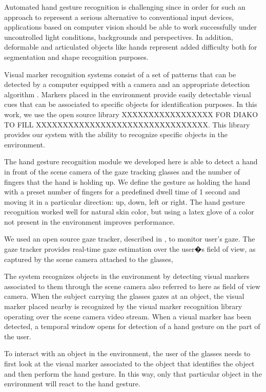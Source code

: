 \documentclass[jou,a4paper,notxfonts]{apa}
\begin{document}
Automated hand gesture recognition is challenging since in order for such an approach to represent a serious alternative
to conventional input devices, applications based on computer vision should be able to work successfully under
uncontrolled light conditions, backgrounds and perspectives. In addition, deformable and articulated objects like hands
represent added difficulty both for segmentation and shape recognition purposes.

Visual marker recognition systems consist of a set of patterns that can be detected by a computer equipped with a camera
and an appropriate detection algorithm \cite{middel19detection}. Markers placed in the environment provide easily
detectable visual cues that can be associated to specific objects for identification purposes. In this work, we use the
open source library XXXXXXXXXXXXXXXXX FOR DIAKO TO FILL XXXXXXXXXXXXXXXXXXXXXXXXXXXXXXXX. This library provides our
system with the ability to recognize specific objects in the environment.


The hand gesture recognition module we developed here is able to detect a hand in front of the scene camera of the gaze
tracking glasses and the number of fingers that the hand is holding up. We define the gesture
as holding the hand with a preset number of fingers for a predefined dwell time of 1 second and moving it in a particular direction:
up, down, left  or right. The hand gesture recognition worked well for natural skin color, but using a latex glove of a
color not present in the environment improves performance.


We used an open source gaze tracker, described in \cite{Mardanbegi2011}, to monitor user's gaze. The gaze tracker
provides real-time gaze estimation over the user�s field of view, as captured by the scene camera attached to the glasses,
 

The system recognizes objects in the environment by detecting visual markers associated to them through the scene camera
also referred to here as field of view camera. When the subject carrying the glasses gazes at an object, the visual
marker placed nearby is recognized by the visual marker recognition library operating over the scene camera video stream.
When a visual marker has been detected, a temporal window opens for detection of a hand gesture on the part of the user. 


To interact with an object in the environment, the user of the glasses needs to first look at the visual marker
associated to the object that identifies the object and then perform the hand gesture. In this way, only that particular
object in the environment will react to the hand gesture.
\end{document}
